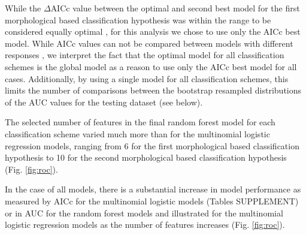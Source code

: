 \documentclass[12pt,letterpaper]{article}\usepackage{graphicx, color}
\begin{document}
While the \(\Delta\)AICc value between the optimal and second best model for the first morphological based classification hypothesis was within the range to be considered equally optimal \citep{Burnham2002a}, for this analysis we chose to use only the AICc best model. While AICc values can not be compared between models with different responses \citep{Burnham2002a}, we interpret the fact that the optimal model for all classification schemes is the global model as a reason to use only the AICc best model for all cases. Additionally, by using a single model for all classification schemes, this limits the number of comparisons between the bootstrap resampled distributions of the AUC values for the testing dataset (see below).




The selected number of features in the final random forest model for each classification scheme varied much more than for the multinomial logistic regression models, ranging from 6 for the first morphological based classification hypothesis to 10 for the second morphological based classification hypothesis (Fig. \ref{fig:roc}). 


In the case of all models, there is a substantial increase in model performance as measured by AICc for the multinomial logistic models (Tables SUPPLEMENT) or in AUC for the random forest models and illustrated for the multinomial logistic regression models as the number of features increases (Fig. \ref{fig:roc}). 
\end{document}

